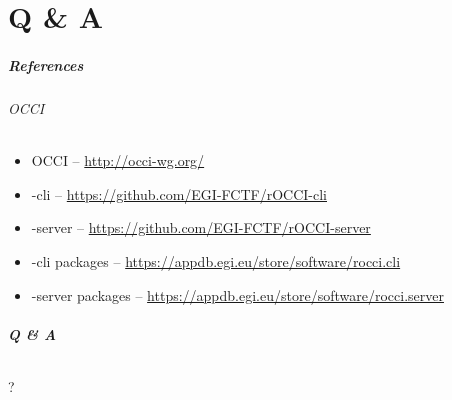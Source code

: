\part{Q \& A}

\begin{frame}
  \frametitle{References}
  \framesubtitle{OCCI}

  \begin{itemize}
    \item OCCI -- \url{http://occi-wg.org/}
    \item \rocci-cli -- \url{https://github.com/EGI-FCTF/rOCCI-cli}
    \item \rocci-server -- \url{https://github.com/EGI-FCTF/rOCCI-server}
    \item \rocci-cli packages -- \url{https://appdb.egi.eu/store/software/rocci.cli}
    \item \rocci-server packages -- \url{https://appdb.egi.eu/store/software/rocci.server}
  \end{itemize}
\end{frame}


\begin{frame}
  \frametitle{Q \& A}
  \framesubtitle{}

  \begin{center}
    {\Huge ?}
  \end{center}
\end{frame}
